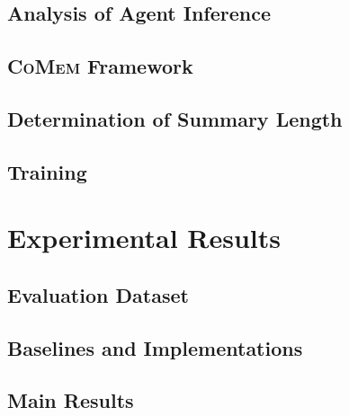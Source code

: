 \documentclass{article}
\theoremstyle{plain}
\theoremstyle{definition}
\theoremstyle{remark}
\newcommand{\model}{\textsc{CoMem}\xspace}
\begin{document}


\subsection{Analysis of Agent Inference}\label{sec:analysis}


\subsection{{\model} Framework}\label{sec:framework}


\subsection{Determination of Summary Length}\label{sec:summary_length}


\subsection{Training}\label{sec:train}


\section{Experimental Results}


\subsection{Evaluation Dataset}


\subsection{Baselines and Implementations}


\subsection{Main Results}\label{sec:main_results}

\end{document}
